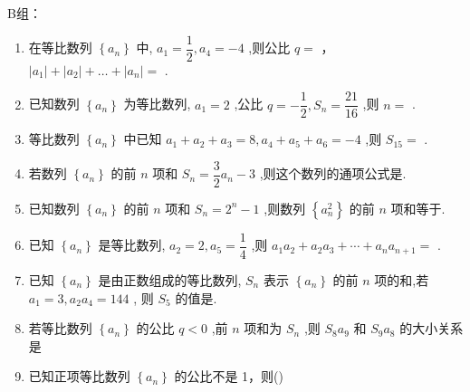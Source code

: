 B组：
\begin{enumerate}
\item 在等比数列 $\left\{  {a}_{n}\right\}$ 中, ${a}_{1} = \dfrac{1}{2},{a}_{4} =  - 4$ ,则公比 $q =$ ，$\left| {a}_{1}\right|  + \left| {a}_{2}\right|  + \ldots  + \left| {a}_{n}\right|  =$ .
    
    \item 已知数列 $\left\{  {a}_{n}\right\}$ 为等比数列, ${a}_{1} = 2$ ,公比 $q =  - \dfrac{1}{2},{S}_{n} = \dfrac{21}{16}$ ,则 $n =$ .
    
    \item 等比数列 $\left\{  {a}_{n}\right\}$ 中已知 ${a}_{1} + {a}_{2} + {a}_{3} = 8,{a}_{4} + {a}_{5} + {a}_{6} =  - 4$ ,则 ${S}_{15} =$ .
    
    \item 若数列 $\left\{  {a}_{n}\right\}$ 的前 $n$ 项和 ${S}_{n} = \dfrac{3}{2}{a}_{n} - 3$ ,则这个数列的通项公式是.

    \item 已知数列 $\left\{  {a}_{n}\right\}$ 的前 $n$ 项和 ${S}_{n} = {2}^{n} - 1$ ,则数列 $\left\{  {a}_{n}^{2}\right\}$ 的前 $n$ 项和等于.
    
    \item 已知 $\left\{  {a}_{n}\right\}$ 是等比数列, ${a}_{2} = 2,{a}_{5} = \dfrac{1}{4}$ ,则 ${a}_{1}{a}_{2} + {a}_{2}{a}_{3} + \cdots  + {a}_{n}{a}_{n + 1} =$ .

    \item 已知 $\left\{  {a}_{n}\right\}$ 是由正数组成的等比数列, ${S}_{n}$ 表示 $\left\{  {a}_{n}\right\}$ 的前 $n$ 项的和,若 ${a}_{1} = 3,{a}_{2}{a}_{4} = {144}$ , 则 ${S}_{5}$ 的值是.
    
    \item 若等比数列 $\left\{  {a}_{n}\right\}$ 的公比 $q < 0$ ,前 $n$ 项和为 ${S}_{n}$ ,则 ${S}_{8}{a}_{9}$ 和 ${S}_{9}{a}_{8}$ 的大小关系是      

    \item 已知正项等比数列 $\left\{a_n\right\}$ 的公比不是 1，则\dotfill{}()


\end{enumerate}
